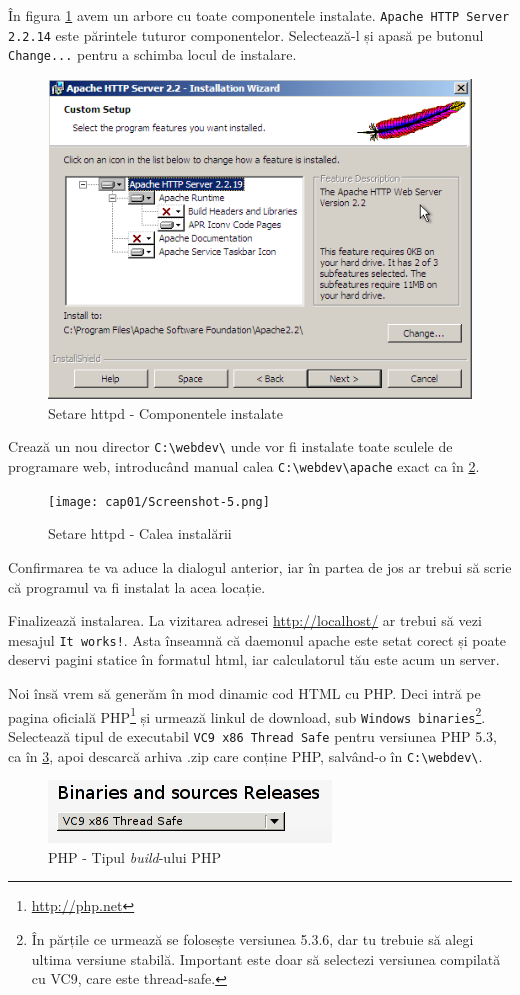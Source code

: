 În figura \ref{fig:httpd components tree} avem un arbore cu toate componentele instalate. \texttt{Apache HTTP Server 2.2.14}
este părintele tuturor componentelor. Selectează-l și apasă pe butonul
\texttt{Change...} pentru a schimba locul de instalare.

\begin{figure}[ht!]
  \centering
    \includegraphics[width=248bp]{cap01/Screenshot-4.png}
  \caption{Setare httpd - Componentele instalate}
  \label{fig:httpd components tree}
\end{figure}

Crează un nou director \texttt{C:{\textbackslash}webdev\textbackslash}
unde vor fi instalate toate sculele
de programare web, introducând manual calea \texttt{C:{\textbackslash}webdev{\textbackslash}apache}
exact ca în \ref{fig:httpd custom path}.

\begin{figure}[ht!]
  \centering
    \texttt{[image: cap01/Screenshot-5.png]}
  \caption{Setare httpd - Calea instalării}
  \label{fig:httpd custom path}
\end{figure}

Confirmarea te va aduce la dialogul anterior, iar în partea de jos ar trebui să scrie
că programul va fi instalat la acea locație.

Finalizează instalarea. La vizitarea adresei \url{http://localhost/} ar trebui să
vezi mesajul \texttt{It works!}. Asta înseamnă că daemonul apache este setat corect și poate deservi
pagini statice în formatul html, iar calculatorul tău este acum un server.

Noi însă vrem să generăm în mod dinamic cod HTML cu PHP. Deci intră pe pagina oficială
PHP\footnote{\url{http://php.net}} și urmează linkul de download,
sub \texttt{Windows binaries}\footnote{În părțile ce urmează se folosește
versiunea 5.3.6, dar tu trebuie să alegi ultima versiune stabilă. Important este 
doar să selectezi versiunea compilată cu VC9, care este thread-safe.}.
Selectează tipul de executabil \texttt{VC9 x86 Thread Safe} pentru
versiunea PHP 5.3, ca în \ref{fig:php build type}, apoi
descarcă arhiva .zip care conține PHP, salvând-o în \texttt{C:{\textbackslash}webdev\textbackslash}.
\begin{figure}[ht!]
  \centering
    \includegraphics[width=150bp]{cap01/Screenshot-7.png}
  \caption{PHP - Tipul \textsl{build}-ului PHP}
  \label{fig:php build type}
\end{figure}


